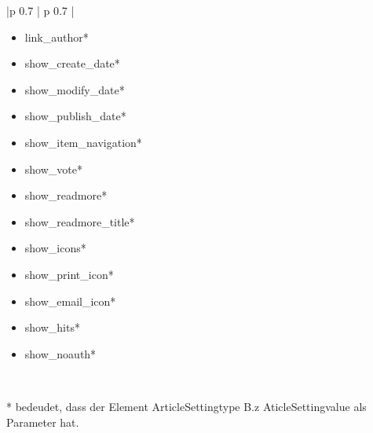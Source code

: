 \begin{minipage}{0.7\textwidth}
\begin{tabular}{|p {0.7\textwidth} | p {0.7\textwidth} |}
\begin{itemize}
\item link\_author*
\item show\_create\_date*
\item show\_modify\_date*
\item show\_publish\_date*
\item show\_item\_navigation*
\item show\_vote*
\item show\_readmore*
\item show\_readmore\_title*
\item show\_icons*
\item show\_print\_icon*
\item show\_email\_icon*
\item show\_hits*
\item show\_noauth*
\end{itemize}
\\ \hline
\end{tabular}
\end{minipage}

* bedeudet, dass der Element ArticleSettingtype B.z AticleSettingvalue als Parameter hat.

